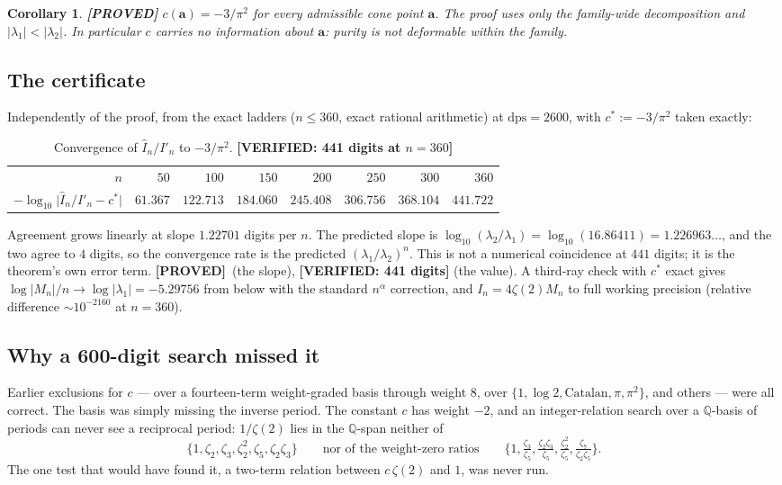 \documentclass[11pt,reqno]{amsart}
\theoremstyle{plain}
\newtheorem{corollary}[theorem]{Corollary}
\theoremstyle{definition}
\theoremstyle{remark}
\newcommand{\PROVED}{{\normalfont\sffamily\bfseries[PROVED]}}
\newcommand{\VER}[1]{{\normalfont\sffamily\bfseries[VERIFIED: #1]}}
\newcommand{\QQ}{\mathbb{Q}}
\newcommand{\dps}{\mathrm{dps}}
\newcommand{\Ihat}{\widehat{I}}
\begin{document}
\begin{corollary}\label{cor:cone} \PROVED
$c(\boldsymbol a)=-3/\pi^2$ for \emph{every} admissible cone point $\boldsymbol a$. The proof uses
only the family-wide decomposition and $|\lambda_1|<|\lambda_2|$. In particular $c$ carries no
information about $\boldsymbol a$: purity is not deformable within the family.
\end{corollary}

\subsection{The certificate}
Independently of the proof, from the exact ladders ($n\le 360$, exact rational arithmetic) at
$\dps=2600$, with $c^*:=-3/\pi^2$ taken exactly:

\begin{table}[h]
\centering
\caption{Convergence of $\Ihat_n/I'_n$ to $-3/\pi^2$. \VER{441 digits at $n=360$}}
\label{tab:cert}
\begin{tabular}{rrrrrrrr}
\toprule
$n$ & $50$ & $100$ & $150$ & $200$ & $250$ & $300$ & $360$\\
$-\log_{10}\bigl|\Ihat_n/I'_n-c^*\bigr|$ & $61.367$ & $122.713$ & $184.060$ & $245.408$
  & $306.756$ & $368.104$ & $\mathbf{441.722}$\\
\bottomrule
\end{tabular}
\end{table}

Agreement grows linearly at slope $1.22701$ digits per $n$. The predicted slope is
$\log_{10}(\lambda_2/\lambda_1)=\log_{10}(16.86411)=1.226963\ldots$, and the two agree to
$4$ digits, so the convergence rate is the predicted $(\lambda_1/\lambda_2)^n$.
This is not a numerical coincidence at $441$
digits; it is the theorem's own error term. \PROVED\ (the slope), \VER{441 digits} (the value).
A third-ray check with $c^*$ exact gives $\log|M_n|/n\to\log|\lambda_1|=-5.29756$ from below with
the standard $n^{\alpha}$ correction, and $I_n=4\zeta(2)M_n$ to full working precision (relative
difference $\sim10^{-2160}$ at $n=360$).

\subsection{Why a 600-digit search missed it}\label{sec:reciprocal}
Earlier exclusions for $c$ --- over a fourteen-term weight-graded basis through weight $8$, over
$\{1,\log2,\text{Catalan},\pi,\pi^2\}$, and others --- were all correct. The basis was simply
missing the inverse period. The constant $c$ has weight $-2$, and an integer-relation search over
a $\QQ$-basis of periods can never see a reciprocal period: $1/\zeta(2)$ lies in the $\QQ$-span
neither of
\[
  \{1,\zeta_2,\zeta_3,\zeta_2^2,\zeta_5,\zeta_2\zeta_3\}
  \qquad\text{nor of the weight-zero ratios}\qquad
  \{1,\tfrac{\zeta_3}{\zeta_5},\tfrac{\zeta_2\zeta_3}{\zeta_5},\tfrac{\zeta_2^2}{\zeta_5},
    \tfrac{\zeta_7}{\zeta_2\zeta_5}\}.
\]
The one test that would have found it, a two-term relation between $c\,\zeta(2)$ and $1$, was
never run.
\end{document}
